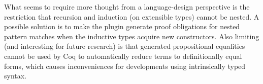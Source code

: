 
What seems to require more thought from a language-design perspective is the
restriction that recursion and induction (on extensible types) cannot be nested.
A possible solution is to make the plugin generate proof obligations for
nested pattern matches when the inductive types acquire new constructors.
%
Also limiting (and interesting for future research) is
that generated propositional equalities cannot be used by Coq to automatically
reduce terms to definitionally equal forms, which causes inconveniences for
developments using intrinsically typed syntax.

